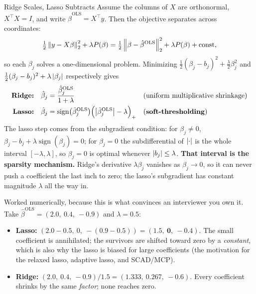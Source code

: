 \begin{mathresult}{Ridge Scales, Lasso Subtracts}
Assume the columns of $X$ are orthonormal, $X^{\top}X = I$, and write $\hat\beta^{\text{OLS}} = X^{\top}y$. Then the objective separates across coordinates:
\begin{equation}
\tfrac{1}{2}\left\lVert y - X\beta\right\rVert_2^2 + \lambda P(\beta)
= \tfrac{1}{2}\left\lVert\beta - \hat\beta^{\text{OLS}}\right\rVert_2^2 + \lambda P(\beta) + \text{const},
\end{equation}
so each $\beta_j$ solves a one-dimensional problem. Minimizing $\tfrac{1}{2}(\beta_j - b_j)^2 + \tfrac{\lambda}{2}\beta_j^2$ and $\tfrac{1}{2}(\beta_j - b_j)^2 + \lambda\left|\beta_j\right|$ respectively gives
\begin{align}
\textbf{Ridge:}\quad & \hat\beta_j = \frac{\hat\beta_j^{\text{OLS}}}{1+\lambda} && \text{(uniform multiplicative shrinkage)} \\
\textbf{Lasso:}\quad & \hat\beta_j = \operatorname{sign}\!\big(\hat\beta_j^{\text{OLS}}\big)\Big(\big|\hat\beta_j^{\text{OLS}}\big| - \lambda\Big)_{+} && \text{(\textbf{soft-thresholding})}
\end{align}
The lasso step comes from the subgradient condition: for $\beta_j \ne 0$, $\beta_j - b_j + \lambda\operatorname{sign}(\beta_j) = 0$; for $\beta_j = 0$ the subdifferential of $\left|\cdot\right|$ is the whole interval $[-\lambda,\lambda]$, so $\beta_j = 0$ is optimal whenever $\left|b_j\right| \le \lambda$. \textbf{That interval is the sparsity mechanism.} Ridge's derivative $\lambda\beta_j$ vanishes as $\beta_j \to 0$, so it can never push a coefficient the last inch to zero; the lasso's subgradient has constant magnitude $\lambda$ all the way in.
\end{mathresult}

Worked numerically, because this is what convinces an interviewer you own it. Take $\hat\beta^{\text{OLS}} = (2.0,\ 0.4,\ -0.9)$ and $\lambda = 0.5$:
\begin{itemize}
    \item \textbf{Lasso:} $(2.0 - 0.5,\ 0,\ -(0.9-0.5)) = (1.5,\ \mathbf{0},\ -0.4)$. The small coefficient is annihilated; the survivors are shifted toward zero by a \emph{constant}, which is also why the lasso is biased for large coefficients (the motivation for the relaxed lasso, adaptive lasso, and SCAD/MCP).
    \item \textbf{Ridge:} $(2.0,\ 0.4,\ -0.9)/1.5 = (1.333,\ 0.267,\ -0.6)$. Every coefficient shrinks by the same \emph{factor}; none reaches zero.
\end{itemize}

